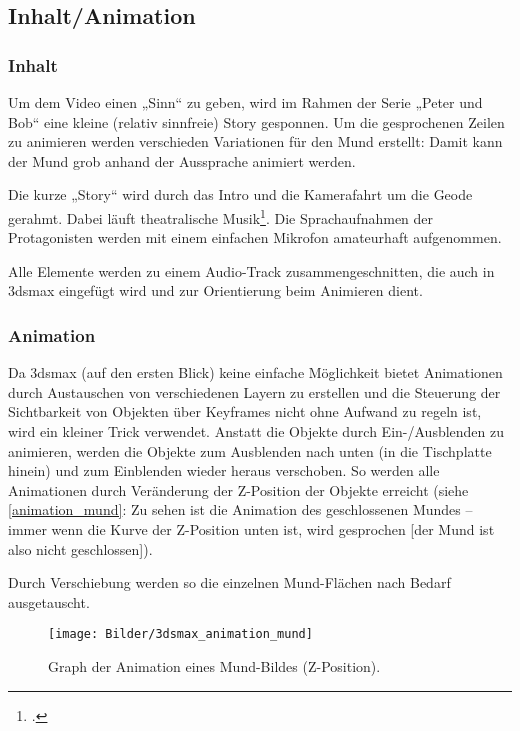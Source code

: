 \documentclass{scrreprt}
\begin{document}
\subsection{Inhalt/Animation}

\subsubsection{Inhalt}
Um dem Video einen „Sinn“ zu geben, wird im Rahmen der Serie „Peter und Bob“ eine kleine (relativ sinnfreie) Story gesponnen. Um die gesprochenen Zeilen zu animieren werden verschieden Variationen für den Mund erstellt: Damit kann der Mund grob anhand der Aussprache animiert werden.

Die kurze „Story“ wird durch das Intro und die Kamerafahrt um die Geode gerahmt. Dabei läuft theatralische Musik\footcite{Wiebusch2017}. Die Sprachaufnahmen der Protagonisten werden mit einem einfachen Mikrofon amateurhaft aufgenommen. 

Alle Elemente werden zu einem Audio-Track zusammengeschnitten, die auch in 3dsmax eingefügt wird und zur Orientierung beim Animieren dient.

\subsubsection{Animation}

Da 3dsmax (auf den ersten Blick) keine einfache Möglichkeit bietet Animationen durch Austauschen von verschiedenen Layern zu erstellen und die Steuerung der Sichtbarkeit von Objekten über Keyframes nicht ohne Aufwand zu regeln ist, wird ein kleiner Trick verwendet. Anstatt die Objekte durch Ein-/Ausblenden zu animieren, werden die Objekte zum Ausblenden nach unten (in die Tischplatte hinein) und zum Einblenden wieder heraus verschoben. So werden alle Animationen durch Veränderung der Z-Position der Objekte erreicht (siehe \autoref{animation_mund}: Zu sehen ist die Animation des geschlossenen Mundes -- immer wenn die Kurve der Z-Position unten ist, wird gesprochen [der Mund ist also nicht geschlossen]).

Durch Verschiebung werden so die einzelnen Mund-Flächen nach Bedarf ausgetauscht.

\begin{figure}[!ht]
\centering
\texttt{[image: Bilder/3dsmax\_animation\_mund]}
\caption{Graph der Animation eines Mund-Bildes (Z-Position).}
\label{animation_mund}
\end{figure}
\end{document}
